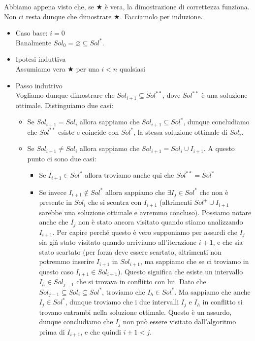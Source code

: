 \documentclass[11pt, a4paper, titlepage, oneside]{scrbook}
\begin{document}
Abbiamo appena visto che, se $\bigstar$ è vera, la dimostrazione di correttezza funziona. Non ci resta dunque che dimostrare $\bigstar$. Facciamolo per induzione.
\begin{itemize}
    \item Caso base: $i = 0$ \\
    Banalmente $Sol_0 = \varnothing \subseteq Sol^*$.
    \item Ipotesi induttiva \\
    Assumiamo vera $\bigstar$ per una $i < n$ qualsiasi
    \item Passo induttivo \\
    Vogliamo dunque dimostrare che $Sol_{i+1} \subseteq Sol^{**}$, dove $Sol^{**}$ è una soluzione ottimale. Distinguiamo due casi:
    \begin{itemize}
        \item Se $Sol_{i+1} = Sol_i$ allora sappiamo che $Sol_{i+1} \subseteq Sol^*$, dunque concludiamo che $Sol^{**}$ esiste e coincide con $Sol^*$, la stessa soluzione ottimale di $Sol_i$.
        \item Se $Sol_{i+1} \neq Sol_i$ allora sappiamo che $Sol_{i+1} = Sol_i \cup I_{i+1}$. A questo punto ci sono due casi:
        \begin{itemize}
            \item Se $I_{i+1} \in Sol^*$ allora troviamo anche qui che $Sol^{**} = Sol^*$
            \item Se invece $I_{i+1} \notin Sol^*$ allora sappiamo che $\exists I_j \in Sol^*$ che non è presente in $Sol_i$ che si scontra con $I_{i+1}$ (altrimenti $Sol^+ \cup I_{i+1}$ sarebbe una soluzione ottimale e avremmo concluso). Possiamo notare anche che $I_j$ non è stato ancora visitato quando stiamo analizzando $I_{i+1}$. Per capire perché questo è vero supponiamo per assurdi che $I_j$ sia già stato visitato quando arriviamo all'iterazione $i+1$, e che sia stato scartato (per forza deve essere scartato, altrimenti non potremmo inserire $I_{i+1}$ in $Sol_{i+1}$, ma sappiamo che se ci troviamo in questo caso $I_{i+1} \in Sol_{i+1}$). Questo significa che esiste un intervallo $I_h \in Sol_{j-1}$ che si trovava in conflitto con lui. Dato che $Sol_{j-1} \subseteq Sol_i \subseteq Sol^*$, troviamo che $I_h \in Sol^*$. Ma sappiamo che anche $I_j \in Sol^*$, dunque troviamo che i due intervalli $I_j$ e $I_h$ in conflitto si trovano entrambi nella soluzione ottimale. Questo è un assurdo, dunque concludiamo che $I_j$ non può essere visitato dall'algoritmo prima di $I_{i+1}$, e che quindi $i + 1 < j$. \\

\end{itemize}
\end{itemize}
\end{itemize}
\end{document}
